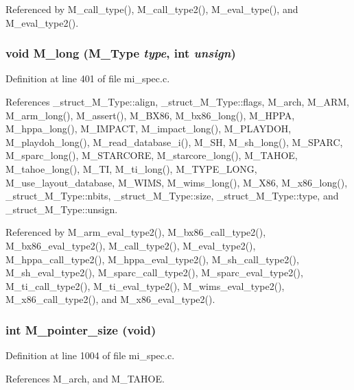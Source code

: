Referenced by M\_\-call\_\-type(), M\_\-call\_\-type2(), M\_\-eval\_\-type(), and M\_\-eval\_\-type2().
\subsubsection{\setlength{\rightskip}{0pt plus 5cm}void M\_\-long (\bf{M\_\-Type} {\em type}, int {\em unsign})}\label{mi__spec_8c_68b8f6847ce398397621c33579171fb8}




Definition at line 401 of file mi\_\-spec.c.

References \_\-struct\_\-M\_\-Type::align, \_\-struct\_\-M\_\-Type::flags, M\_\-arch, M\_\-ARM, M\_\-arm\_\-long(), M\_\-assert(), M\_\-BX86, M\_\-bx86\_\-long(), M\_\-HPPA, M\_\-hppa\_\-long(), M\_\-IMPACT, M\_\-impact\_\-long(), M\_\-PLAYDOH, M\_\-playdoh\_\-long(), M\_\-read\_\-database\_\-i(), M\_\-SH, M\_\-sh\_\-long(), M\_\-SPARC, M\_\-sparc\_\-long(), M\_\-STARCORE, M\_\-starcore\_\-long(), M\_\-TAHOE, M\_\-tahoe\_\-long(), M\_\-TI, M\_\-ti\_\-long(), M\_\-TYPE\_\-LONG, M\_\-use\_\-layout\_\-database, M\_\-WIMS, M\_\-wims\_\-long(), M\_\-X86, M\_\-x86\_\-long(), \_\-struct\_\-M\_\-Type::nbits, \_\-struct\_\-M\_\-Type::size, \_\-struct\_\-M\_\-Type::type, and \_\-struct\_\-M\_\-Type::unsign.

Referenced by M\_\-arm\_\-eval\_\-type2(), M\_\-bx86\_\-call\_\-type2(), M\_\-bx86\_\-eval\_\-type2(), M\_\-call\_\-type2(), M\_\-eval\_\-type2(), M\_\-hppa\_\-call\_\-type2(), M\_\-hppa\_\-eval\_\-type2(), M\_\-sh\_\-call\_\-type2(), M\_\-sh\_\-eval\_\-type2(), M\_\-sparc\_\-call\_\-type2(), M\_\-sparc\_\-eval\_\-type2(), M\_\-ti\_\-call\_\-type2(), M\_\-ti\_\-eval\_\-type2(), M\_\-wims\_\-eval\_\-type2(), M\_\-x86\_\-call\_\-type2(), and M\_\-x86\_\-eval\_\-type2().
\subsubsection{\setlength{\rightskip}{0pt plus 5cm}int M\_\-pointer\_\-size (void)}\label{mi__spec_8c_e793cc6538b793b34c086eac0f1fde67}




Definition at line 1004 of file mi\_\-spec.c.

References M\_\-arch, and M\_\-TAHOE.
